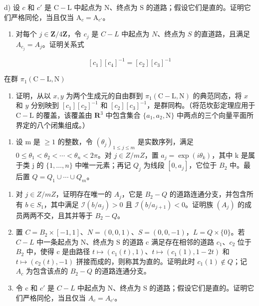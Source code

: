 d) 设 \(c\) 和 \(c'\) 是 \(\mathrm{C} - \mathrm{L}\) 中起点为 \(\mathrm{N}\)、终点为 \(\mathrm{S}\) 的道路；假设它们是直的。证明它们严格同伦，当且仅当 \(\mathrm{A}_c = \mathrm{A}_{c'}\)。

\begin{enumerate}
\def\labelenumi{\alph{enumi})}
\setcounter{enumi}{4}
\tightlist
\item
  对每个 \(j \in \mathbf{Z}/4\mathbf{Z}\)，令 \(c_j\) 是 \(C-L\) 中起点为 \(N\)、终点为 \(S\) 的直道路，且满足 \(A_{c_j} = A_j\)。证明关系式
\end{enumerate}

\[
[ c _ {1} ] [ c _ {4} ] ^ {- 1} = [ c _ {2} ] [ c _ {3} ] ^ {- 1}
\]

在群 \(\pi_1(\mathrm{C} - \mathrm{L},\mathrm{N})\)

\begin{enumerate}
\def\labelenumi{\alph{enumi})}
\setcounter{enumi}{5}
\tightlist
\item
   证明，从以 \(x, y\) 为两个生成元的自由群到 \(\pi_1(\mathrm{C} - \mathrm{L}, \mathrm{N})\) 的典范同态，将 \(x\) 和 \(y\) 分别映到 \([c_1][c_2]^{-1}\) 和 \([c_2][c_3]^{-1}\)，是群同构。（将范坎彭定理应用于 \(\mathrm{C} - \mathrm{L}\) 的覆盖，该覆盖由 \(\mathbf{R}^3\) 中包含集合 \(\{a_1, a_2, \mathrm{N}\}\) 中两点的三个向量平面所界定的八个闭集组成。）
\end{enumerate}

\begin{enumerate}
\def\labelenumi{\arabic{enumi})}
\setcounter{enumi}{23}
\tightlist
\item
   设 m 是 \(\geqslant 1\) 的整数，令 \((\theta_{j})_{1\leqslant j\leqslant m}\) 是实数序列，满足 \(0\leqslant\theta_{1}<\theta_{2}<\cdots<\theta_{n}<2\pi\)。对 \(j\in Z/mZ\)，置 \(a_{j}=\exp(i\theta_{k})\)，其中 k 是属于类 j 的 \(\{1,\ldots,n\}\) 中唯一元素；再记 \(Q_{j}\) 为线段 \([0,a_{j}]\)，它位于 \(B_{2}\) 中。最后置 \(Q=Q_{1}\cup\cdots\cup Q_{m}\)。
\end{enumerate}

\begin{enumerate}
\def\labelenumi{\alph{enumi})}
\item
  对 \(j \in Z/mZ\)，证明存在唯一的 \(A_{j}\)，它是 \(B_{2}-Q\) 的道路连通分支，并包含所有 \(b \in S_{1}\)，其中满足 \(\mathcal{I}(b/a_{j}) > 0\) 且 \(\mathcal{I}(b/a_{j+1}) < 0\)。证明族 \((A_{j})\) 的成员两两不交，且其并等于 \(B_{2}-Q\)。
\item
   置 \(C = B_{2} \times [-1, 1]\)、\(N = (0, 0, 1)\)、\(S = (0, 0, -1)\)，\(L = Q \times \{0\}\)。若 \(C-L\) 中一条起点为 N、终点为 S 的道路 c 满足存在相邻的道路 \(c_{1}\)、\(c_{2}\) 位于 \(B_{2}\) 中，使得 c 是由路径 \(t \mapsto (c_{1}(t), 1)\)、\(t \mapsto (c_{1}(1), 1 - 2t)\) 和 \(t \mapsto (c_{2}(t), -1)\) 拼接而成的，则称其为直的。证明此时 \(c_{1}(1) \notin Q\)；记 \(A_{c}\) 为包含该点的 \(B_{2}-Q\) 的道路连通分支。
\item
   令 c 和 \(c'\) 是 \(C-L\) 中起点为 N、终点为 S 的道路；假设它们是直的。证明它们严格同伦，当且仅当 \(A_{c} = A_{c'}\)。
\end{enumerate}

